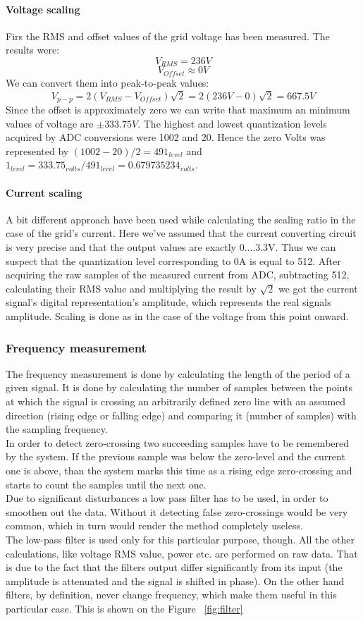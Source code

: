 \paragraph{Voltage scaling}
Firs the RMS and offset values of the grid voltage has been measured. The results were: 
\[ V_{RMS}=236V \] 
\[ V_{Offset} \approx 0V\]
We can convert them into peak-to-peak values:
\[ V_{p-p}=2(V_{RMS}-V_{Offset})\sqrt{2}=2(236V-0)\sqrt{2}=667.5V \]
Since the offset is approximately zero we can write that maximum an minimum values of voltage are $ \pm333.75V $. The highest and lowest quantization levels acquired by ADC conversions were 1002 and 20. Hence the zero Volts was represented by $ (1002-20)/2=491_{level} $ and $ 1_{level}=333.75_{volts}/491_{level}=0.679735234_{volts} $.

\paragraph{Current scaling}
A bit different approach have been used while calculating the scaling ratio in the case of the grid's current. Here we've assumed that the current converting circuit is very precise and that the output values are exactly 0....3.3V. Thus we can suspect that the quantization level corresponding to 0A is equal to 512. After acquiring the raw samples of the measured current from ADC, subtracting 512, calculating their RMS value and multiplying the result by $ \sqrt{2} $ we got the current signal's digital representation's amplitude, which represents the real signals amplitude. Scaling is done as in the case of the voltage from this point onward.

\subsubsection{Frequency measurement}
The frequency measurement is done by calculating the length of the period of a given signal. It is done by calculating the number of samples between the points at which the signal is crossing an arbitrarily defined zero line with an assumed direction (rising edge or falling edge) and comparing it (number of samples) with the sampling frequency.\\
In order to detect zero-crossing two succeeding samples have to be remembered by the system. If the previous sample was below the zero-level and the current one is above, than the system marks this time as a rising edge zero-crossing and starts to count the samples until the next one.\\
Due to significant disturbances a low pass filter has to be used, in order to smoothen out the data. Without it detecting false zero-crossings would be very common, which in turn would render the method completely useless.\\
The low-pass filter is used only for this particular purpose, though. All the other calculations, like voltage RMS value, power etc. are performed on raw data. That is due to the fact that the filters output differ significantly from its input (the amplitude is attenuated and the signal is shifted in phase). On the other hand filters, by definition, never change frequency, which make them useful in this particular case. This is shown on the Figure ~\ref{fig:filter}

